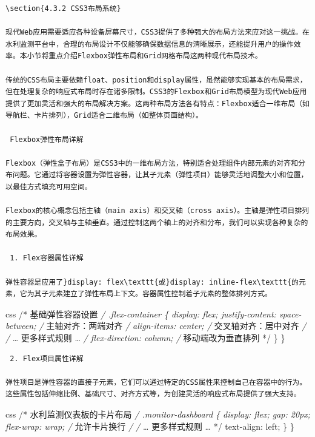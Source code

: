 \begin{lstlisting}
\section{4.3.2 CSS3布局系统}

现代Web应用需要适应各种设备屏幕尺寸，CSS3提供了多种强大的布局方法来应对这一挑战。在水利监测平台中，合理的布局设计不仅能够确保数据信息的清晰展示，还能提升用户的操作效率。本小节将重点介绍Flexbox弹性布局和Grid网格布局这两种现代布局技术。

传统的CSS布局主要依赖float、position和display属性，虽然能够实现基本的布局需求，但在处理复杂的响应式布局时存在诸多限制。CSS3的Flexbox和Grid布局模型为现代Web应用提供了更加灵活和强大的布局解决方案。这两种布局方法各有特点：Flexbox适合一维布局（如导航栏、卡片排列），Grid适合二维布局（如整体页面结构）。

 Flexbox弹性布局详解

Flexbox（弹性盒子布局）是CSS3中的一维布局方法，特别适合处理组件内部元素的对齐和分布问题。它通过将容器设置为弹性容器，让其子元素（弹性项目）能够灵活地调整大小和位置，以最佳方式填充可用空间。

Flexbox的核心概念包括主轴（main axis）和交叉轴（cross axis）。主轴是弹性项目排列的主要方向，交叉轴与主轴垂直。通过控制这两个轴上的对齐和分布，我们可以实现各种复杂的布局效果。

 1. Flex容器属性详解

弹性容器是应用了}display: flex\texttt{或}display: inline-flex\texttt{的元素，它为其子元素建立了弹性布局上下文。容器属性控制着子元素的整体排列方式。
\end{lstlisting}

css /* 基础弹性容器设置 \emph{/ .flex-container \{ display: flex; justify-content: space-between; /} 主轴对齐：两端对齐 \emph{/ align-items: center; /} 交叉轴对齐：居中对齐 \emph{/ /} \ldots{} 更多样式规则 \ldots{} \emph{/ flex-direction: column; /} 移动端改为垂直排列 */ \} \}

\begin{lstlisting}
 2. Flex项目属性详解

弹性项目是弹性容器的直接子元素，它们可以通过特定的CSS属性来控制自己在容器中的行为。这些属性包括伸缩比例、基础尺寸、对齐方式等，为创建灵活的响应式布局提供了强大支持。
\end{lstlisting}

css /* 水利监测仪表板的卡片布局 \emph{/ .monitor-dashboard \{ display: flex; gap: 20px; flex-wrap: wrap; /} 允许卡片换行 \emph{/ /} \ldots{} 更多样式规则 \ldots{} */ text-align: left; \} \}

